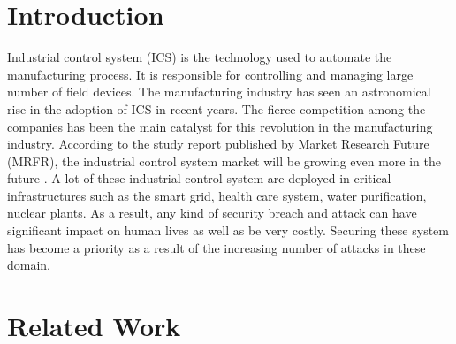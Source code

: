 \documentclass[conference]{IEEEtran}
\begin{document}
\begin{IEEEkeywords}

\end{IEEEkeywords}

\section{Introduction}
Industrial control system (ICS) is the technology used to automate the manufacturing process. It is responsible for controlling and managing large number of field devices. The manufacturing industry has seen an astronomical rise in the adoption of ICS in recent years. The fierce competition among the companies has been the main catalyst for this revolution in the manufacturing industry. According to the study report published by  Market Research Future (MRFR), the industrial control system market will be growing even more in the future \cite{c1}. A lot of these industrial control system are deployed in critical infrastructures such as the smart grid, health care system, water purification, nuclear plants. As a result, any kind of security breach and attack can have significant impact on human lives as well as be very costly. Securing these system has become a priority as a result of the increasing number of attacks in these domain. 
\section{Related Work}
\end{document}
